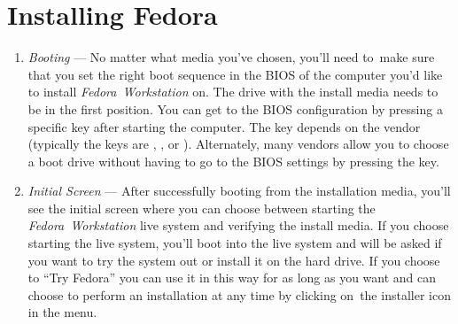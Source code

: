 \section*{Installing Fedora}
\begin{enumerate}
\item\emph{Booting} --- No matter what media you've chosen, you'll need to~make sure that you set the right boot sequence in the BIOS of the computer you'd like to install \emph{Fedora~Workstation} on. The drive with the install media needs to be in the first position. You can get to the BIOS configuration by pressing a specific key after starting the computer. The key depends on the vendor (typically the keys are , , or ). Alternately, many vendors allow you to choose a boot drive without having to go to the BIOS settings by pressing the  key.

\item\emph{Initial Screen} --- After successfully booting from the installation media, you'll see the initial screen where you can choose between starting the \emph{Fedora~Workstation} live system and verifying the install media. If you choose starting the live system, you'll boot into the live system and will be asked if you want to try the system out or install it on the hard drive. If you choose to \enquote{Try Fedora} you can use it in this way for as long as you want and can choose to perform an installation at any time by clicking on~the installer icon in the menu.


\end{enumerate}
